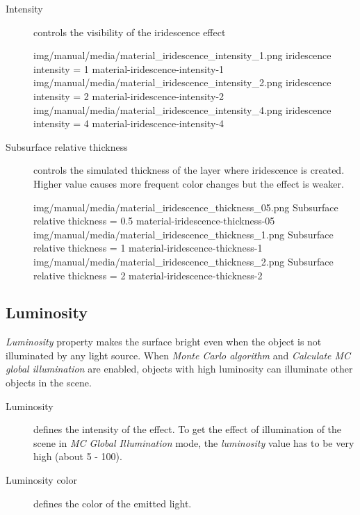 \begin{description}
	\item[Intensity] controls the visibility of the iridescence effect
	
	\threeImagesWithTwoCaptionsFullWidth
	{img/manual/media/material_iridescence_intensity_1.png}
	{iridescence intensity = 1}
	{material-iridescence-intensity-1}
	{img/manual/media/material_iridescence_intensity_2.png}
	{iridescence intensity = 2}
	{material-iridescence-intensity-2}
	{img/manual/media/material_iridescence_intensity_4.png}
	{iridescence intensity = 4}
	{material-iridescence-intensity-4}
	
	\item[Subsurface relative thickness] controls the simulated thickness of the layer where iridescence is created. Higher value causes more frequent color changes but the effect is weaker.
	
	\threeImagesWithTwoCaptionsFullWidth
	{img/manual/media/material_iridescence_thickness_05.png}
	{Subsurface relative thickness = 0.5}
	{material-iridescence-thickness-05}
	{img/manual/media/material_iridescence_thickness_1.png}
	{Subsurface relative thickness = 1}
	{material-iridescence-thickness-1}
	{img/manual/media/material_iridescence_thickness_2.png}
	{Subsurface relative thickness = 2}
	{material-iridescence-thickness-2}
	
\end{description}

\subsection{Luminosity}\label{materials-luminosity}

\emph{Luminosity} property makes the surface bright even when the object is not illuminated by any light source. When \emph{Monte Carlo algorithm} and \emph{Calculate MC global illumination} are enabled, objects with high luminosity can illuminate other objects in the scene. 

\begin{description}
	\item[Luminosity] defines the intensity of the effect. To get the effect of illumination of the scene in\emph{ MC Global Illumination} mode, the \emph{luminosity} value has to be very high (about 5 - 100). 
	\item[Luminosity color] defines the color of the emitted light.
\end{description}

